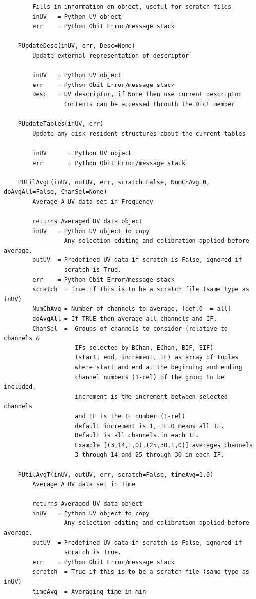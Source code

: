 \documentclass[11pt]{report}
\begin{document}
\begin{verbatim}
        Fills in information on object, useful for scratch files
        inUV   = Python UV object
        err    = Python Obit Error/message stack
    
    PUpdateDesc(inUV, err, Desc=None)
        Update external representation of descriptor
        
        inUV   = Python UV object
        err    = Python Obit Error/message stack
        Desc   = UV descriptor, if None then use current descriptor
                 Contents can be accessed throuth the Dict member
    
    PUpdateTables(inUV, err)
        Update any disk resident structures about the current tables
        
        inUV      = Python UV object
        err       = Python Obit Error/message stack
    
    PUtilAvgF(inUV, outUV, err, scratch=False, NumChAvg=0, doAvgAll=False, ChanSel=None)
        Average A UV data set in Frequency
        
        returns Averaged UV data object
        inUV   = Python UV object to copy
                 Any selection editing and calibration applied before average.
        outUV  = Predefined UV data if scratch is False, ignored if
                 scratch is True.
        err    = Python Obit Error/message stack
        scratch  = True if this is to be a scratch file (same type as inUV)
        NumChAvg = Number of channels to average, [def.0  = all]
        doAvgAll = If TRUE then average all channels and IF.
        ChanSel  =  Groups of channels to consider (relative to channels &
                    IFs selected by BChan, EChan, BIF, EIF)
                    (start, end, increment, IF) as array of tuples
                    where start and end at the beginning and ending
                    channel numbers (1-rel) of the group to be included,
                    increment is the increment between selected channels
                    and IF is the IF number (1-rel)
                    default increment is 1, IF=0 means all IF.
                    Default is all channels in each IF.
                    Example [(3,14,1,0),(25,30,1,0)] averages channels
                    3 through 14 and 25 through 30 in each IF.
    
    PUtilAvgT(inUV, outUV, err, scratch=False, timeAvg=1.0)
        Average A UV data set in Time
        
        returns Averaged UV data object
        inUV   = Python UV object to copy
                 Any selection editing and calibration applied before average.
        outUV  = Predefined UV data if scratch is False, ignored if
                 scratch is True.
        err    = Python Obit Error/message stack
        scratch  = True if this is to be a scratch file (same type as inUV)
        timeAvg  = Averaging time in min
    

\end{verbatim}
\end{document}
